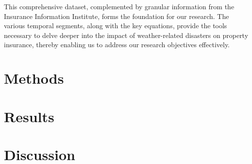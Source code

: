 \documentclass[12pt]{article}
\begin{document}
This comprehensive dataset, complemented by granular information from the Insurance Information Institute, forms the foundation for 
our research. The various temporal segments, along with the key equations, provide the tools necessary to delve deeper into the 
impact of weather-related disasters on property insurance, thereby enabling us to address our research objectives effectively.



\section{Methods}
\label{sec:meth}




\section{Results}
\label{sec:resu}




\section{Discussion}
\label{sec:disc}





\end{document}
